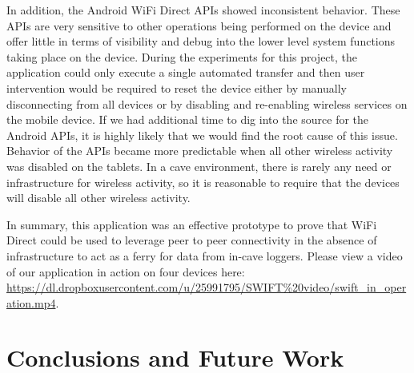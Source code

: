 \documentclass[10pt,twocolumn]{article}
\begin{document}
In addition, the Android WiFi Direct APIs showed inconsistent behavior.
These APIs are very sensitive to other operations being performed on the device and offer little in terms of visibility and debug into the lower level system functions taking place on the device.
During the experiments for this project, the application could only execute a single automated transfer and then user intervention would be required to reset the device either by manually disconnecting from all devices or by disabling and re-enabling wireless services on the mobile device.
If we had additional time to dig into the source for the Android APIs, it is highly likely that we would find the root cause of this issue.
Behavior of the APIs became more predictable when all other wireless activity was disabled on the tablets.
In a cave environment, there is rarely any need or infrastructure for wireless activity, so it is reasonable to require that the devices will disable all other wireless activity.

In summary, this application was an effective prototype to prove that WiFi Direct could be used to leverage peer to peer connectivity in the absence of infrastructure to act as a ferry for data from in-cave loggers.
Please view a video of our application in action on four devices here: \url{https://dl.dropboxusercontent.com/u/25991795/SWIFT%20video/swift_in_operation.mp4}.

\section{Conclusions and Future Work}
\end{document}
